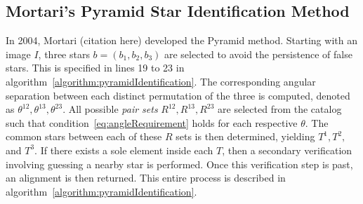 \subsection{Mortari's Pyramid Star Identification Method}\label{subsec:mortari'sPyramidStarIdentificationMethod}
In 2004, Mortari (citation here) developed the Pyramid method. Starting with an image $I$, three stars
$b = (b_1, b_2, b_3)$ are selected to avoid the persistence of false stars. This is specified in lines 19 to 23 in
algorithm~\autoref{algorithm:pyramidIdentification}. The corresponding angular separation between each distinct
permutation of the three is computed, denoted as $\theta^{12}, \theta^{13}, \theta^{23}$. All possible
\textit{pair sets} $R^{12}, R^{13}, R^{23}$ are selected from the catalog such that
condition~\eqref{eq:angleRequirement} holds for each respective $\theta$. The common stars between each of these $R$
sets is then determined, yielding $T^1, T^2, $ and $T^3$. If there exists a sole element inside each $T$, then a
secondary verification involving guessing a nearby star is performed. Once this verification step is past, an
alignment is then returned. This entire process is described in algorithm~\autoref{algorithm:pyramidIdentification}.

